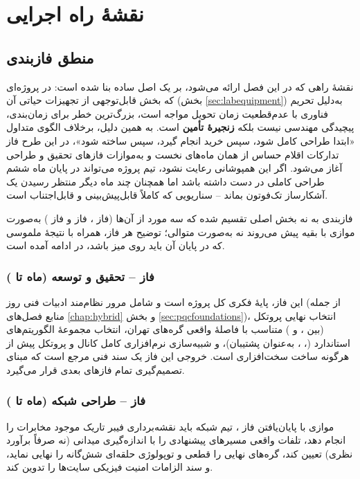 \chapter{نقشهٔ راه اجرایی}
\label{ch:roadmap}

\section{منطق فازبندی}

نقشهٔ راهی که در این فصل ارائه می‌شود، بر یک اصل ساده بنا شده است: در پروژه‌ای که بخش قابل‌توجهی از تجهیزات حیاتی آن (بخش \ref{sec:labequipment}) به‌دلیل تحریم فناوری با عدم‌قطعیت زمان تحویل مواجه است، بزرگ‌ترین خطر برای زمان‌بندی، پیچیدگی مهندسی نیست بلکه \textbf{زنجیرهٔ تأمین} است. به همین دلیل، برخلاف الگوی متداول «ابتدا طراحی کامل شود، سپس خرید انجام گیرد، سپس ساخته شود»، در این طرح فاز تدارکات اقلام حساس از همان ماه‌های نخست و به‌موازات فازهای تحقیق و طراحی آغاز می‌شود. اگر این همپوشانی رعایت نشود، تیم پروژه می‌تواند در پایان ماه ششم طراحی کاملی در دست داشته باشد اما همچنان چند ماه دیگر منتظر رسیدن یک آشکارساز تک‌فوتون بماند -- سناریویی که کاملاً قابل‌پیش‌بینی و قابل‌اجتناب است.

فازبندی به نه بخش اصلی تقسیم شده که سه مورد از آن‌ها (فاز ، فاز  و فاز ) به‌صورت موازی با بقیه پیش می‌روند نه به‌صورت متوالی؛ توضیح هر فاز، همراه با نتیجهٔ ملموسی که در پایان آن باید روی میز باشد، در ادامه آمده است.

\subsection*{فاز \texorpdfstring{}{۰} -- تحقیق و توسعه (ماه \texorpdfstring{}{۱} تا \texorpdfstring{}{۳})}
این فاز، پایهٔ فکری کل پروژه است و شامل مرور نظام‌مند ادبیات فنی روز (از جمله منابع فصل‌های \ref{chap:hybrid} و بخش \ref{sec:pqcfoundations})، انتخاب نهایی پروتکل  (بین ،  و ) متناسب با فاصلهٔ واقعی گره‌های تهران، انتخاب مجموعهٔ الگوریتم‌های  استاندارد  (، ،  به‌عنوان پشتیبان)، و شبیه‌سازی نرم‌افزاری کامل کانال و پروتکل پیش از هرگونه ساخت سخت‌افزاری است. خروجی این فاز یک سند فنی مرجع است که مبنای تصمیم‌گیری تمام فازهای بعدی قرار می‌گیرد.

\subsection*{فاز \texorpdfstring{}{۱} -- طراحی شبکه (ماه \texorpdfstring{}{۲} تا \texorpdfstring{}{۴})}
موازی با پایان‌یافتن فاز ، تیم شبکه باید نقشه‌برداری فیبر تاریک موجود مخابرات را انجام دهد، تلفات واقعی مسیرهای پیشنهادی را با اندازه‌گیری میدانی (نه صرفاً برآورد نظری) تعیین کند، گره‌های نهایی را قطعی و توپولوژی حلقه‌ای شش‌گانه را نهایی نماید، و سند الزامات امنیت فیزیکی سایت‌ها را تدوین کند.

